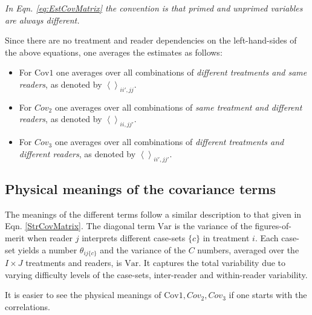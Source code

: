 \documentclass[
]{book}
\providecommand{\tightlist}{%
  \setlength{\itemsep}{0pt}\setlength{\parskip}{0pt}}
\begin{document}
\emph{In Eqn. \eqref{eq:EstCovMatrix} the convention is that primed and unprimed variables are always different.}

Since there are no treatment and reader dependencies on the left-hand-sides of the above equations, one averages the estimates as follows:

\begin{itemize}
\tightlist
\item
  For \(\text{Cov1}\) one averages over all combinations of \emph{different treatments and same readers}, as denoted by \(\left \langle \right \rangle_{ii',jj}\).
\item
  For \(Cov_2\) one averages over all combinations of \emph{same treatment and different readers}, as denoted by \(\left \langle \right \rangle_{ii,jj'}\).
\item
  For \(Cov_3\) one averages over all combinations of \emph{different treatments and different readers}, as denoted by \(\left \langle \right \rangle_{ii',jj'}\).
\end{itemize}

\hypertarget{PhysicalMeaningsOfCovMatrix}{%
\subsection{Physical meanings of the covariance terms}\label{PhysicalMeaningsOfCovMatrix}}

The meanings of the different terms follow a similar description to that given in Eqn. \ref{StrCovMatrix}. The diagonal term \(\text{Var}\) is the variance of the figures-of-merit when reader \(j\) interprets different case-sets \(\{c\}\) in treatment \(i\). Each case-set yields a number \(\theta_{ij\{c\}}\) and the variance of the \(C\) numbers, averaged over the \(I \times J\) treatments and readers, is \(\text{Var}\). It captures the total variability due to varying difficulty levels of the case-sets, inter-reader and within-reader variability.

It is easier to see the physical meanings of \(\text{Cov1}, Cov_2, Cov_3\) if one starts with the correlations.
\end{document}
